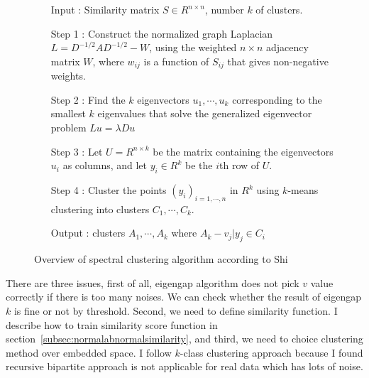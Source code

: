 \begin{figure}[ht]
\begin{mdframed}
\begin{enumerate}
\item[Input] : Similarity matrix $S \in R^{n \times n}$, number $k$ of clusters. \\
\item[Step 1] : Construct the normalized graph Laplacian $L = D^{-1/2} A D^{-1/2} - W$, using the weighted $n \times n$ adjacency matrix $W$, where $w_{ij}$ is a function of $S_{ij}$ that gives non-negative weights. \\
\item[Step 2] : Find the $k$ eigenvectors $u_1, \cdots, u_k$ corresponding to the smallest $k$ eigenvalues that solve the generalized eigenvector problem $L u = \lambda D u$ \\
\item[Step 3] : Let $U = R^{n \times k}$ be the matrix containing the eigenvectors $u_i$ as columns, and let $y_i \in R^k$ be the $i$th row of $U$.\\
\item[Step 4] : Cluster the points $(y_i)_{i=1,\cdots,n}$ in $R^k$ using $k$-means clustering into clusters $C_1,\cdots,C_k$.\\
\item[Output] : clusters $A_1, \cdots, A_k$ where $A_k - {v_j|y_j \in C_i}$
\end{enumerate}
\end{mdframed}
\caption{Overview of spectral clustering algorithm according to Shi}
\end{figure}

There are three issues, first of all, eigengap algorithm does not pick $v$ value correctly if there is too many noises. 
We can check whether the result of eigengap $k$ is fine or not by threshold. 
Second, we need to define similarity function. 
I describe how to train similarity score function in section~\ref{subsec:normalabnormalsimilarity}, and third, we need to choice clustering method over embedded space. 
I follow $k$-class clustering approach because I found recursive bipartite approach is not applicable for real data which has lots of noise. 
